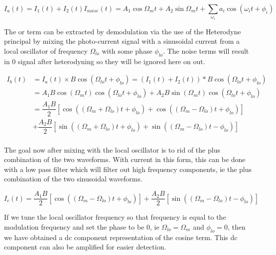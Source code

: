 \documentclass[11pt,a4paper]{book}
\begin{document}
			\begin{equation}
				I_a(t)=I_1 (t) +I_2 (t) I_{noise}(t)= A_1 \cos{\Omega_m t} + A_2 \sin{\Omega_m t} +\sum_{\omega_i}^{} a_i \cos{(\omega_i t + \phi_i)}
			\end{equation}
			
			The  or  term can be extracted by demodulation via the use of the Heterodyne principal by mixing the photo-current signal with a sinusoidal current from a local oscillator of frequency $\Omega_{lo}$ with some phase $\phi_{lo}$. The noise terms will result in 0 signal after heterodyning so they will be ignored here on out.
		
			\begin{equation}
				\begin{split}
				I_b(t) &=I_a(t) \times B\cos(\Omega_{lo}t +\phi_{lo}) =(I_1 (t) +I_2 (t))*B\cos(\Omega_{lo}t +\phi_{lo}) \\
				& = A_1 B \cos{(\Omega_m t)}\cos(\Omega_{lo}t +\phi_{lo}) + A_2B \sin{(\Omega_m t)}\cos(\Omega_{lo}t +\phi_{lo}) \\
				& = \dfrac{A_1 B}{2} \left[ \cos{\left(\left(\Omega_m+\Omega_{lo}\right)t+\phi_{lo}\right)}  + \cos{\left( \left( \Omega_m - \Omega_{lo} \right)t +\phi_{lo}        \right)}                                    \right]\\
				& + \dfrac{A_2 B}{2} \left[ \sin{\left(\left(\Omega_m+\Omega_{lo}\right)t+\phi_{lo}\right)}  + \sin{\left( \left( \Omega_m - \Omega_{lo} \right)t -\phi_{lo}        \right)}                                    \right]\\
				\end{split}
			\end{equation}			 
		
			The goal now after mixing with the local oscillator is to rid of the plus combination of the two waveforms. With current in this form, this can be done with a low pass filter which will filter out high frequency components, ie the plus combination of the two sinusoidal waveforms.
		
			\begin{equation}
				I_c(t) = \dfrac{A_1 B}{2} \left[\cos{\left(\left(\Omega_m-\Omega_{lo} \right)t +\phi_{lo}\right)}\right]
				+\dfrac{A_2 B}{2}\left[\sin{\left(\left(\Omega_m-\Omega_{lo}\right)t-\phi_{lo}\right)}\right]
			\end{equation}					
			
			If we tune the local oscillator frequency so that frequency is equal to the modulation frequency and set the phase to be 0, ie $\Omega_{lo}=\Omega_m$ and $\phi_{lo}=0$, then we have obtained a dc component representation of the cosine term. This dc component can also be amplified for easier detection.
		
\end{document}
